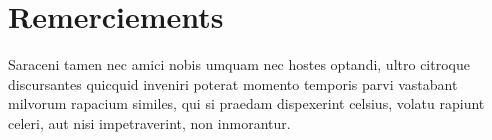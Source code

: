 \documentclass[oneside]{memoir}
\begin{document}
\pagebreak

\setcounter{page}{1}



\chapter*{Remerciements}
Saraceni tamen nec amici nobis umquam nec hostes optandi, ultro
citroque discursantes quicquid inveniri poterat momento temporis parvi
vastabant milvorum rapacium similes, qui si praedam dispexerint
celsius, volatu rapiunt celeri, aut nisi impetraverint, non
inmorantur.




\appendix

% 
\end{document}
